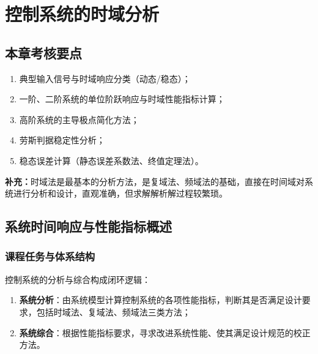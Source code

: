 \chapter{控制系统的时域分析}

\setlength{\parskip}{0.8ex plus 0.3ex minus 0.2ex}   %
\renewcommand{\arraystretch}{1.5}      %
\setlength{\tabcolsep}{10pt}           %
\addtolength{\abovedisplayskip}{2pt}   %
\addtolength{\belowdisplayskip}{2pt}   %

\bigskip  %

\section{本章考核要点}
\begin{enumerate}
    \item 典型输入信号与时域响应分类（动态/稳态）；
    \item 一阶、二阶系统的单位阶跃响应与时域性能指标计算；
    \item 高阶系统的主导极点简化方法；
    \item 劳斯判据稳定性分析；
    \item 稳态误差计算（静态误差系数法、终值定理法）。
\end{enumerate}
\noindent\textbf{补充：}时域法是最基本的分析方法，是复域法、频域法的基础，直接在时间域对系统进行分析和设计，直观准确，但求解解析解过程较繁琐。

\medskip

\section{系统时间响应与性能指标概述}
\subsection{课程任务与体系结构}
控制系统的分析与综合构成闭环逻辑：
\begin{enumerate}
    \item \textbf{系统分析}：由系统模型计算控制系统的各项性能指标，判断其是否满足设计要求，包括时域法、复域法、频域法三类方法；
    \item \textbf{系统综合}：根据性能指标要求，寻求改进系统性能、使其满足设计规范的校正方法。
\end{enumerate}


